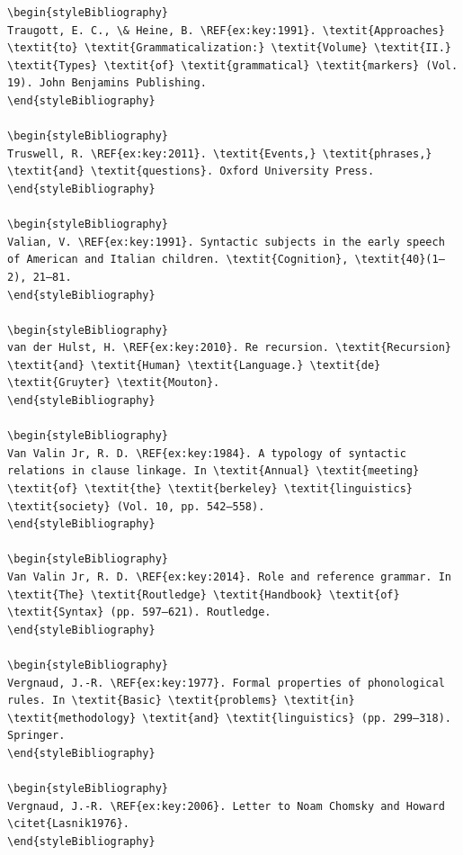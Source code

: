 \begin{verbatim}
\begin{styleBibliography}
Traugott, E. C., \& Heine, B. \REF{ex:key:1991}. \textit{Approaches} \textit{to} \textit{Grammaticalization:} \textit{Volume} \textit{II.} \textit{Types} \textit{of} \textit{grammatical} \textit{markers} (Vol. 19). John Benjamins Publishing.
\end{styleBibliography}

\begin{styleBibliography}
Truswell, R. \REF{ex:key:2011}. \textit{Events,} \textit{phrases,} \textit{and} \textit{questions}. Oxford University Press.
\end{styleBibliography}

\begin{styleBibliography}
Valian, V. \REF{ex:key:1991}. Syntactic subjects in the early speech of American and Italian children. \textit{Cognition}, \textit{40}(1–2), 21–81.
\end{styleBibliography}

\begin{styleBibliography}
van der Hulst, H. \REF{ex:key:2010}. Re recursion. \textit{Recursion} \textit{and} \textit{Human} \textit{Language.} \textit{de} \textit{Gruyter} \textit{Mouton}.
\end{styleBibliography}

\begin{styleBibliography}
Van Valin Jr, R. D. \REF{ex:key:1984}. A typology of syntactic relations in clause linkage. In \textit{Annual} \textit{meeting} \textit{of} \textit{the} \textit{berkeley} \textit{linguistics} \textit{society} (Vol. 10, pp. 542–558).
\end{styleBibliography}

\begin{styleBibliography}
Van Valin Jr, R. D. \REF{ex:key:2014}. Role and reference grammar. In \textit{The} \textit{Routledge} \textit{Handbook} \textit{of} \textit{Syntax} (pp. 597–621). Routledge.
\end{styleBibliography}

\begin{styleBibliography}
Vergnaud, J.-R. \REF{ex:key:1977}. Formal properties of phonological rules. In \textit{Basic} \textit{problems} \textit{in} \textit{methodology} \textit{and} \textit{linguistics} (pp. 299–318). Springer.
\end{styleBibliography}

\begin{styleBibliography}
Vergnaud, J.-R. \REF{ex:key:2006}. Letter to Noam Chomsky and Howard \citet{Lasnik1976}.
\end{styleBibliography}


\end{verbatim}

